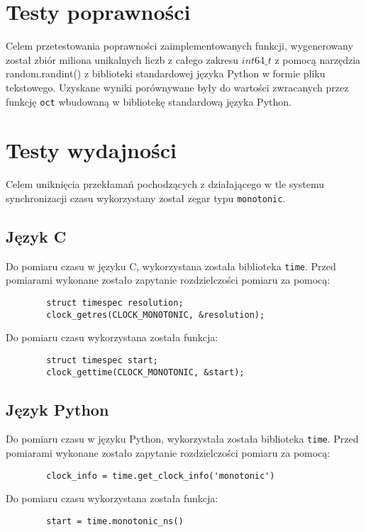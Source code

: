 \documentclass[11pt]{article}
\begin{document}
	\section{Testy poprawności}
	Celem przetestowania poprawności zaimplementowanych funkcji, 
	wygenerowany został zbiór miliona unikalnych liczb z całego zakresu $int64\_t$ 
	z pomocą narzędzia random.randint() z biblioteki standardowej języka Python w formie pliku tekstowego.
	Uzyskane wyniki porównywane były do wartości zwracanych przez funkcję \texttt{oct} wbudowaną w bibliotekę
	standardową języka Python.
	
	\section{Testy wydajności}
		Celem uniknięcia przekłamań pochodzących z działającego w tle systemu synchronizacji czasu
		wykorzystany został zegar typu \lstinline{monotonic}.

		\subsection{Język C}
		Do pomiaru czasu w języku C, wykorzystana została biblioteka \lstinline{time}.
		Przed pomiarami wykonane zostało zapytanie rozdzielczości pomiaru za pomocą:
		\begin{lstlisting}
		struct timespec resolution;
		clock_getres(CLOCK_MONOTONIC, &resolution);
		\end{lstlisting}
		Do pomiaru czasu wykorzystana została funkcja:
		\begin{lstlisting}
		struct timespec start;
		clock_gettime(CLOCK_MONOTONIC, &start);
		\end{lstlisting}

		\subsection{Język Python}
		Do pomiaru czasu w języku Python, wykorzystała została biblioteka \lstinline{time}.
		Przed pomiarami wykonane zostało zapytanie rozdzielczości pomiaru za pomocą:
		\begin{lstlisting}
		clock_info = time.get_clock_info('monotonic')
		\end{lstlisting}
		Do pomiaru czasu wykorzystana została funkcja:
		\begin{lstlisting}
		start = time.monotonic_ns()
		\end{lstlisting}
\end{document}
